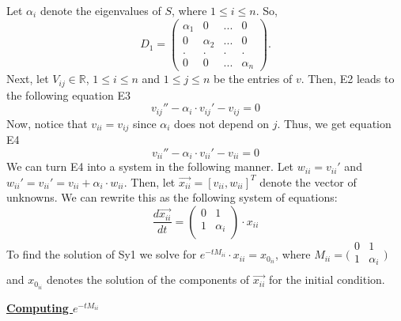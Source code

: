 Let $\alpha_i$ denote the eigenvalues of $S$, where $1 \leq i \leq n$. So, 
\begin{equation*}
    D_1 = \begin{pmatrix}
      \alpha_1 & 0 & ... & 0\\
       0 & \alpha_2 & ... & 0\\
       . & . & . & .\\
       0 & 0 & ... & \alpha_n
    \end{pmatrix}. 
\end{equation*}
Next, let $V_{ij} \in \mathbb{R}$, $1 \leq i \leq n$ and $1 \leq j \leq n$ be the entries of $v$. 
Then, E2 leads to the following equation E3
\begin{equation}
\tag{E3}
    v_{ij}'' - \alpha_i \cdot v_{ij}' - v_{ij} = 0
\end{equation}
Now, notice that $v_{ii} = v_{ij}$ since $\alpha_i$ does not depend on $j$. Thus, we get equation E4
\begin{equation}
\tag{E4}
    v_{ii}'' - \alpha_i \cdot v_{ii}' - v_{ii} = 0
\end{equation}
We can turn E4 into a system in the following manner. Let $ w_{ii} = v_{ii}'$ and $w_{ii}' = v_{ii}' = v_{ii} + \alpha_i \cdot w_{ii}$. Then, let $\Vec{x_{ii}} = [v_{ii}, w_{ii}]^T$ denote the vector of unknowns. We can rewrite this as the following system of equations:
\begin{equation*}
\tag{Sy1}
    \frac{d \Vec{x_{ii}}}{dt} = \begin{pmatrix}
      0 & 1\\
      1 & \alpha_i\\
    \end{pmatrix} \cdot x_{ii}
\end{equation*}
To find the solution of Sy1 we solve for $e^{-tM_{ii}} \cdot x_{ii} = x_0_{ii}$, where $M_{ii} = \big(\begin{smallmatrix}
      0 & 1\\
      1 & \alpha_i\\
    \end{smallmatrix}\big)$ and $x_0_{ii}$ denotes the solution of the components of $\Vec{x_{ii}}$ for the initial condition. 

\underline{\textbf{Computing $e^{-tM_{ii}}$}}

